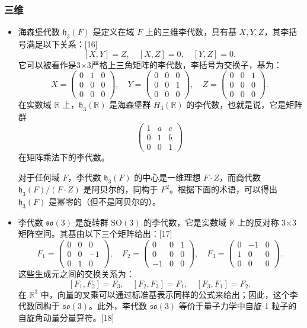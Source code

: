 \subsubsection{三维}  
\begin{itemize}
\item 海森堡代数 \( \mathfrak{h}_3(F) \) 是定义在域 \( F \) 上的三维李代数，具有基 \( X, Y, Z \)，其李括号满足以下关系：[16]
\[
[X, Y] = Z, \quad [X, Z] = 0, \quad [Y, Z] = 0.~
\]
它可以被看作是3×3严格上三角矩阵的李代数，李括号为交换子，基为：
\[
X = \left( \begin{array}{ccc} 0 & 1 & 0 \\ 0 & 0 & 0 \\ 0 & 0 & 0 \end{array} \right), \quad Y = \left( \begin{array}{ccc} 0 & 0 & 0 \\ 0 & 0 & 1 \\ 0 & 0 & 0 \end{array} \right), \quad Z = \left( \begin{array}{ccc} 0 & 0 & 1 \\ 0 & 0 & 0 \\ 0 & 0 & 0 \end{array} \right).~
\]
在实数域 \( \mathbb{R} \) 上，\( \mathfrak{h}_3(\mathbb{R}) \) 是海森堡群 \( H_3(\mathbb{R}) \) 的李代数，也就是说，它是矩阵群
\[
\left( \begin{array}{ccc} 1 & a & c \\ 0 & 1 & b \\ 0 & 0 & 1 \end{array} \right)~
\]
在矩阵乘法下的李代数。

对于任何域 \( F \)，李代数 \( \mathfrak{h}_3(F) \) 的中心是一维理想 \( F \cdot Z \)，而商代数 \( \mathfrak{h}_3(F) / (F \cdot Z) \) 是阿贝尔的，同构于 \( F^2 \)。根据下面的术语，可以得出 \( \mathfrak{h}_3(F) \) 是幂零的（但不是阿贝尔的）。
\item 李代数 \( \mathfrak{so}(3) \) 是旋转群 \( \mathrm{SO}(3) \) 的李代数，它是实数域 \( \mathbb{R} \) 上的反对称 3×3 矩阵空间。其基由以下三个矩阵给出：[17]
\[
F_1 = \left( \begin{array}{ccc} 0 & 0 & 0 \\ 0 & 0 & -1 \\ 0 & 1 & 0 \end{array} \right), \quad F_2 = \left( \begin{array}{ccc} 0 & 0 & 1 \\ 0 & 0 & 0 \\ -1 & 0 & 0 \end{array} \right), \quad F_3 = \left( \begin{array}{ccc} 0 & -1 & 0 \\ 1 & 0 & 0 \\ 0 & 0 & 0 \end{array} \right).~
\]
这些生成元之间的交换关系为：
\[
[F_1, F_2] = F_3, \quad [F_2, F_3] = F_1, \quad [F_3, F_1] = F_2.~
\]
在 \( \mathbb{R}^3 \) 中，向量的叉乘可以通过标准基表示同样的公式来给出；因此，这个李代数同构于 \( \mathfrak{so}(3) \)。此外，李代数 \( \mathfrak{so}(3) \) 等价于量子力学中自旋-1 粒子的自旋角动量分量算符。[18]


\end{itemize}
